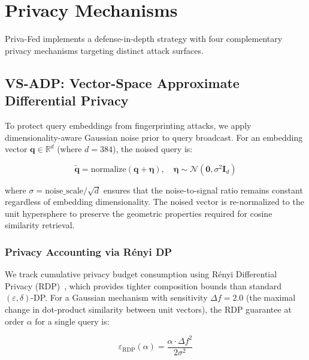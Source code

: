 \documentclass[conference]{IEEEtran}
\begin{document}
\section{Privacy Mechanisms}
\label{sec:privacy}

Priva-Fed implements a defense-in-depth strategy with four complementary privacy mechanisms targeting distinct attack surfaces.

\subsection{VS-ADP: Vector-Space Approximate Differential Privacy}

To protect query embeddings from fingerprinting attacks, we apply dimensionality-aware Gaussian noise prior to query broadcast. For an embedding vector $\mathbf{q} \in \mathbb{R}^d$ (where $d=384$), the noised query is:

\begin{equation}
    \tilde{\mathbf{q}} = \text{normalize}\left(\mathbf{q} + \boldsymbol{\eta}\right), \quad \boldsymbol{\eta} \sim \mathcal{N}\left(\mathbf{0}, \sigma^2 \mathbf{I}_d\right)
\end{equation}

where $\sigma = \text{noise\_scale} / \sqrt{d}$ ensures that the noise-to-signal ratio remains constant regardless of embedding dimensionality. The noised vector is re-normalized to the unit hypersphere to preserve the geometric properties required for cosine similarity retrieval.

\subsubsection{Privacy Accounting via R\'{e}nyi DP}

We track cumulative privacy budget consumption using R\'{e}nyi Differential Privacy (RDP)~\cite{mironov2017renyi}, which provides tighter composition bounds than standard $(\varepsilon, \delta)$-DP. For a Gaussian mechanism with sensitivity $\Delta f = 2.0$ (the maximal change in dot-product similarity between unit vectors), the RDP guarantee at order $\alpha$ for a single query is:

\begin{equation}
    \varepsilon_{\text{RDP}}(\alpha) = \frac{\alpha \cdot \Delta f^2}{2\sigma^2}
\end{equation}
\end{document}

